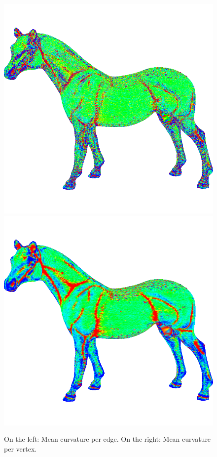 \begin{figure}[!h]
    \includegraphics[scale=0.42]{images/horse-mce.png}
    \endminipage\hfill
    \centering
    \centering
    \includegraphics[scale=0.42]{images/horse-mcv.png}
    \endminipage\hfill
    \caption{On the left: Mean curvature per edge. On the right: Mean curvature per vertex.}
    \label{fig:comparison-gc-gci}
\end{figure}